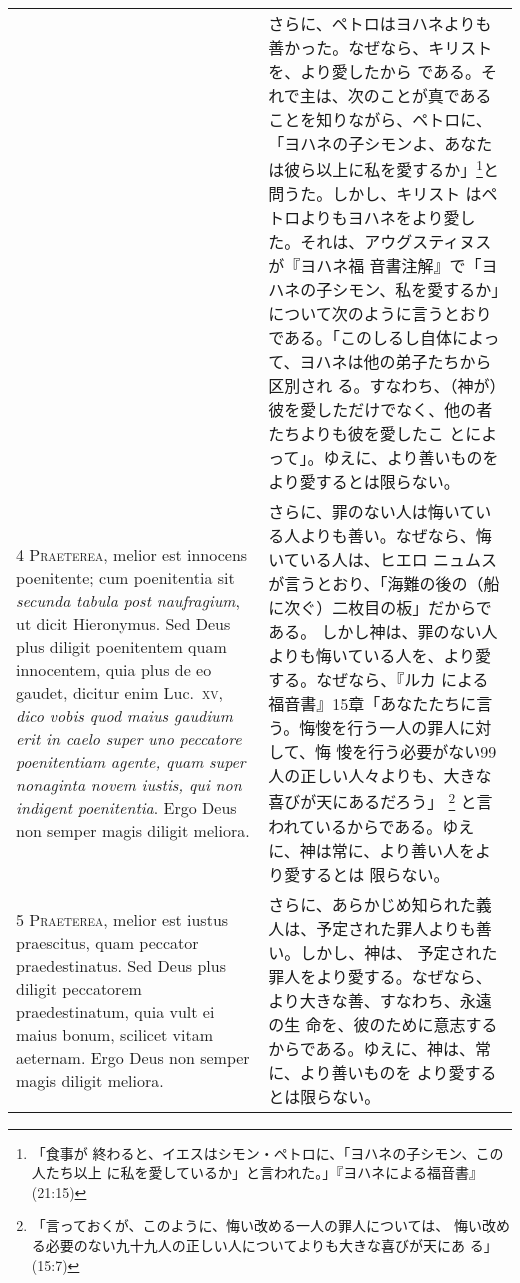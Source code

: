 \documentclass[10pt]{jsarticle} %
\begin{document}
\begin{longtable}{p{21em}p{21em}}
&

さらに、ペトロはヨハネよりも善かった。なぜなら、キリストを、より愛したから
 である。それで主は、次のことが真であることを知りながら、ペトロに、
 「ヨハネの子シモンよ、あなたは彼ら以上に私を愛するか」\footnote{「食事が
 終わると、イエスはシモン・ペトロに、「ヨハネの子シモン、この人たち以上
 に私を愛しているか」と言われた。」『ヨハネによる福音書』(21:15)}と問うた。しかし、キリスト
 はペトロよりもヨハネをより愛した。それは、アウグスティヌスが『ヨハネ福
 音書注解』で「ヨハネの子シモン、私を愛するか」について次のように言うとおりである。「このしるし自体によって、ヨハネは他の弟子たちから区別され
る。すなわち、（神が）彼を愛しただけでなく、他の者たちよりも彼を愛したこ
 とによって」。ゆえに、より善いものをより愛するとは限らない。

\\


{\scshape 4 Praeterea}, melior est innocens poenitente; cum poenitentia
 sit {\itshape secunda tabula post naufragium}, ut dicit Hieronymus. Sed Deus plus
 diligit poenitentem quam innocentem, quia plus de eo gaudet, dicitur
 enim Luc.~{\scshape xv}, {\itshape dico vobis quod maius gaudium erit in caelo super uno
 peccatore poenitentiam agente, quam super nonaginta novem iustis, qui
 non indigent poenitentia}. Ergo Deus non semper magis diligit meliora.


&

さらに、罪のない人は悔いている人よりも善い。なぜなら、悔いている人は、ヒエロ
 ニュムスが言うとおり、「海難の後の（船に次ぐ）二枚目の板」だからである。
しかし神は、罪のない人よりも悔いている人を、より愛する。なぜなら、『ルカ
 による福音書』15章「あなたたちに言う。悔悛を行う一人の罪人に対して、悔
 悛を行う必要がない99人の正しい人々よりも、大きな喜びが天にあるだろう」
 \footnote{「言っておくが、このように、悔い改める一人の罪人については、
 悔い改める必要のない九十九人の正しい人についてよりも大きな喜びが天にあ
 る」(15:7)}
 と言われているからである。ゆえに、神は常に、より善い人をより愛するとは
 限らない。


\\


{\scshape 5 Praeterea}, melior est iustus praescitus, quam peccator
 praedestinatus. Sed Deus plus diligit peccatorem praedestinatum, quia
 vult ei maius bonum, scilicet vitam aeternam. Ergo Deus non semper
 magis diligit meliora.

&

さらに、あらかじめ知られた義人は、予定された罪人よりも善い。しかし、神は、
 予定された罪人をより愛する。なぜなら、より大きな善、すなわち、永遠の生
 命を、彼のために意志するからである。ゆえに、神は、常に、より善いものを
 より愛するとは限らない。



\end{longtable}
\end{document}
